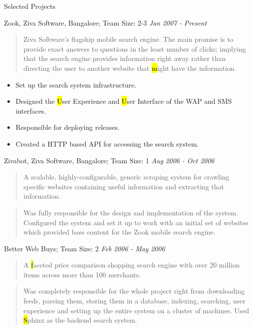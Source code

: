 \documentclass{resume}
\newcommand{\period}{\hfill\small\sl}
\newcommand{\teamsize}{\sc\footnotesize Team Size: }
\begin{document}
\begin{category}{Selected Projects}{}
    \item {\topic Zook,} Ziva Software, Bangalore;
        {\teamsize 2-3}
        {\period Jan 2007 - Present}
        \begin{quotation}
            Ziva Software's flagship mobile search engine.  The main promise is to
            provide exact answers to questions in the least number of clicks;
            implying that the search engine provides information right away rather
            than directing the user to another website that {\hl might} have the
            information.
        \end{quotation}

            \begin{itemize}
                \item Set up the search system infrastructure.
                \item Designed the {\hl User Experience} and {\hl User Interface}
                    of the WAP and SMS interfaces.
                \item Responsible for deploying releases.
                \item Created a HTTP based API for accessing the search system.
            \end{itemize}

    \pagebreak

    \item {\topic Zivabot,} Ziva Software, Bangalore;
        {\teamsize 1}
        {\period Aug 2006 - Oct 2006}
        \begin{quotation}
            A scalable, highly-configurable, generic scraping system for crawling
            specific websites containing useful information and extracting that
            information.
        \end{quotation}
        \begin{quotation}
            Was fully responsible for the design and implementation of the system.
            Configured the system and set it up to work with an initial set of
            websites which provided base content for the Zook mobile search engine.
        \end{quotation}

    \item {\topic Better Web Buys;}
        {\teamsize 2}
        {\period Feb 2006 - May 2006}
        \begin{quotation}
            A {\hl faceted price comparison shopping search engine} with over 20
            million items across more than 100 merchants.
        \end{quotation}
        \begin{quotation}
            Was completely responsible for the whole project right from downloading
            feeds, parsing them, storing them in a database, indexing, searching,
            user experience and setting up the entire system on a cluster of
            machines. Used {\hl Sphinx} as the backend search system.
        \end{quotation}


\end{category}
\end{document}
